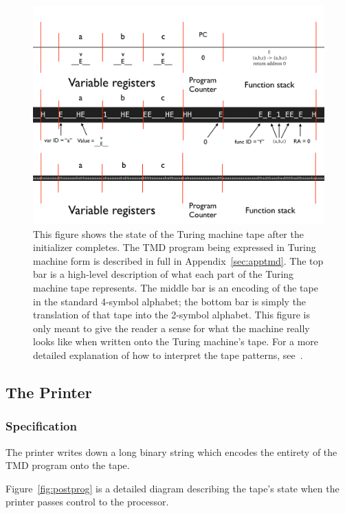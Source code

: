 \documentclass[11pt]{article}
\begin{document}
\begin{figure} 
\begin{center} 
\includegraphics[scale=0.42]{figs/postinit.png}
\caption{This figure shows the state of the Turing machine tape after the initializer completes. The TMD program being expressed in Turing machine form is described in full in Appendix~\ref{sec:apptmd}. The top bar is a high-level description of what each part of the Turing machine tape represents. The middle bar is an encoding of the tape in the standard 4-symbol alphabet; the bottom bar is simply the translation of that tape into the 2-symbol alphabet. This figure is only meant to give the reader a sense for what the machine really looks like when written onto the Turing machine's tape. For a more detailed explanation of how to interpret the tape patterns, see~\cite{github}. \label{fig:postinit}} 
\end{center} 
\end{figure}

\subsection{The Printer}

\subsubsection{Specification}

The printer writes down a long binary string which encodes the entirety of the TMD program onto the tape.

Figure~\ref{fig:postprog} is a detailed diagram describing the tape's state when the printer passes control to the processor.
\end{document}
